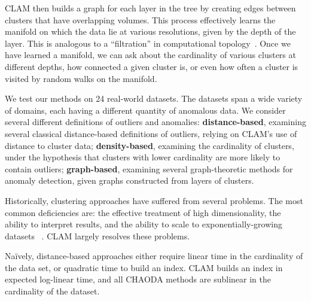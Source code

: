 CLAM then builds a graph for each layer in the tree by creating edges between clusters that have overlapping volumes.
This process effectively learns the manifold on which the data lie at various resolutions, given by the depth of the layer.
This is analogous to a ``filtration'' in computational topology~\cite{carlsson2009topology}.
Once we have learned a manifold, we can ask about the cardinality of various clusters at different depths, how connected a given cluster is, or even how often a cluster is visited by random walks on the manifold.

We test our methods on 24 real-world datasets.
The datasets span a wide variety of domains, each having a different quantity of anomalous data.
We consider several different definitions of outliers and anomalies: \textbf{distance-based}, examining several classical distance-based definitions of outliers, relying on CLAM's use of distance to cluster data; \textbf{density-based}, examining the cardinality of clusters, under the hypothesis that clusters with lower cardinality are more likely to contain outliers; \textbf{graph-based}, examining several graph-theoretic methods for anomaly detection, given graphs constructed from layers of clusters.

Historically, clustering approaches have suffered from several problems.
The most common deficiencies are: the effective treatment of high dimensionality, the ability to interpret results, and the ability to scale to exponentially-growing datasets ~\cite{agrawal1998automatic}.
CLAM largely resolves these problems.

Na\"ively, distance-based approaches either require linear time in the cardinality of the data set, or quadratic time to build an index. CLAM builds an index in expected log-linear time, and all CHAODA methods are sublinear in the cardinality of the dataset.

